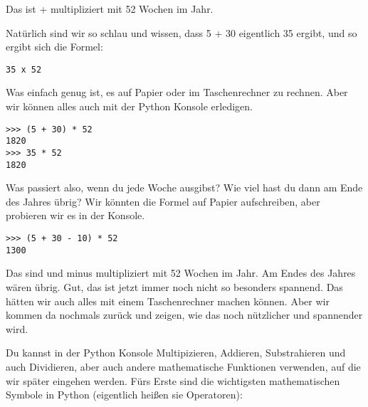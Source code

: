 Das ist  +  multipliziert mit 52 Wochen im Jahr. \begin{samepage}Natürlich sind wir so schlau und wissen, dass 5 + 30 eigentlich 35 ergibt, und so ergibt sich die Formel:


\begin{verbatim}
35 x 52
\end{verbatim}
\end{samepage}

Was einfach genug ist, es auf Papier oder im Taschenrechner zu rechnen. Aber wir können alles auch mit der Python Konsole erledigen.

\begin{Verbatim}[frame=single]
>>> (5 + 30) * 52
1820
>>> 35 * 52
1820
\end{Verbatim}

Was passiert also, wenn du jede Woche  ausgibst? Wie viel hast du dann am Ende des Jahres übrig? Wir könnten die Formel auf Papier aufschreiben, aber probieren wir es in der Konsole.

\begin{Verbatim}[frame=single]
>>> (5 + 30 - 10) * 52
1300
\end{Verbatim}

Das sind  und  minus  multipliziert mit 52 Wochen im Jahr. Am Endes des Jahres wären  übrig. Gut, das ist jetzt immer noch nicht so besonders spannend. Das hätten wir auch alles mit einem Taschenrechner machen können. Aber wir kommen da nochmals zurück und zeigen, wie das noch nützlicher und spannender wird.

Du kannst in der Python Konsole Multipizieren, Addieren, Substrahieren und auch Dividieren, aber auch andere mathematische Funktionen verwenden, auf die wir später eingehen werden. Fürs Erste sind die wichtigsten mathematischen Symbole in Python (eigentlich heißen sie Operatoren):

